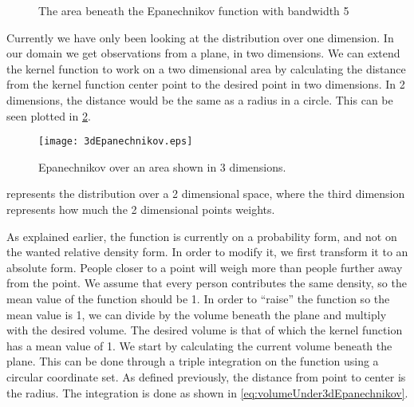 \begin{figure}
\centering
{}
\caption{The area beneath the Epanechnikov function with bandwidth 5}
\label{fig:1dEpanechnikovDistributionWithHPlot}
\end{figure}

Currently we have only been looking at the distribution over one dimension. In our domain we get observations from a plane, in two dimensions. We can extend the kernel function to work on a two dimensional area by calculating the distance from the kernel function center point to the desired point in two dimensions. In 2 dimensions, the distance would be the same as a radius in a circle. This can be seen plotted in \cref{fig:3dEpanechnikov}.

\begin{figure}[htbp]
\centering
    \texttt{[image: 3dEpanechnikov.eps]}
    \caption{Epanechnikov over an area shown in 3 dimensions.}
    \label{fig:3dEpanechnikov}
\end{figure}

 represents the distribution over a 2 dimensional space, where the third dimension represents how much the 2 dimensional points weights.

As explained earlier, the function is currently on a probability form, and not on the wanted relative density form. In order to modify it, we first transform it to an absolute form. People closer to a point will weigh more than people further away from the point. We assume that every person contributes the same density, so the mean value of the function should be 1. In order to \enquote{raise} the function so the mean value is 1, we can divide by the volume beneath the plane and multiply with the desired volume. The desired volume is that of which the kernel function has a mean value of 1. We start by calculating the current volume beneath the plane. This can be done through a triple integration on the function using a circular coordinate set. As defined previously, the distance from point to center is the radius. The integration is done as shown in \cref{eq:volumeUnder3dEpanechnikov}.

